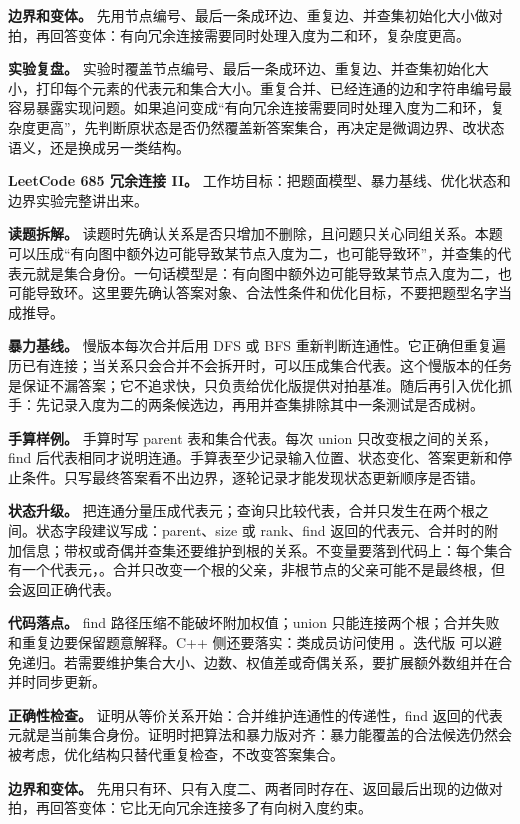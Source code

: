 \textbf{边界和变体。} 先用节点编号、最后一条成环边、重复边、并查集初始化大小做对拍，再回答变体：有向冗余连接需要同时处理入度为二和环，复杂度更高。

\textbf{实验复盘。} 实验时覆盖节点编号、最后一条成环边、重复边、并查集初始化大小，打印每个元素的代表元和集合大小。重复合并、已经连通的边和字符串编号最容易暴露实现问题。如果追问变成“有向冗余连接需要同时处理入度为二和环，复杂度更高”，先判断原状态是否仍然覆盖新答案集合，再决定是微调边界、改状态语义，还是换成另一类结构。

\noindent\textbf{LeetCode 685 冗余连接 II。} 工作坊目标：把题面模型、暴力基线、优化状态和边界实验完整讲出来。

\textbf{读题拆解。} 读题时先确认关系是否只增加不删除，且问题只关心同组关系。本题可以压成“有向图中额外边可能导致某节点入度为二，也可能导致环”，并查集的代表元就是集合身份。一句话模型是：有向图中额外边可能导致某节点入度为二，也可能导致环。这里要先确认答案对象、合法性条件和优化目标，不要把题型名字当成推导。

\textbf{暴力基线。} 慢版本每次合并后用 DFS 或 BFS 重新判断连通性。它正确但重复遍历已有连接；当关系只会合并不会拆开时，可以压成集合代表。这个慢版本的任务是保证不漏答案；它不追求快，只负责给优化版提供对拍基准。随后再引入优化抓手：先记录入度为二的两条候选边，再用并查集排除其中一条测试是否成树。

\textbf{手算样例。} 手算时写 parent 表和集合代表。每次 union 只改变根之间的关系，find 后代表相同才说明连通。手算表至少记录输入位置、状态变化、答案更新和停止条件。只写最终答案看不出边界，逐轮记录才能发现状态更新顺序是否错。

\textbf{状态升级。} 把连通分量压成代表元；查询只比较代表，合并只发生在两个根之间。状态字段建议写成：parent、size 或 rank、find 返回的代表元、合并时的附加信息；带权或奇偶并查集还要维护到根的关系。不变量要落到代码上：每个集合有一个代表元，。合并只改变一个根的父亲，非根节点的父亲可能不是最终根，但  会返回正确代表。

\textbf{代码落点。} find 路径压缩不能破坏附加权值；union 只能连接两个根；合并失败和重复边要保留题意解释。C++ 侧还要落实：类成员访问使用 。迭代版  可以避免递归。若需要维护集合大小、边数、权值差或奇偶关系，要扩展额外数组并在合并时同步更新。

\textbf{正确性检查。} 证明从等价关系开始：合并维护连通性的传递性，find 返回的代表元就是当前集合身份。证明时把算法和暴力版对齐：暴力能覆盖的合法候选仍然会被考虑，优化结构只替代重复检查，不改变答案集合。

\textbf{边界和变体。} 先用只有环、只有入度二、两者同时存在、返回最后出现的边做对拍，再回答变体：它比无向冗余连接多了有向树入度约束。

